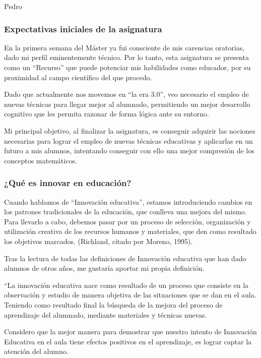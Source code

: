 \begin{opin}{\pedrocolor}{Pedro}

\subsubsection{Expectativas iniciales de la asignatura}

En la primera semana del Máster ya fui consciente de mis carencias oratorias, dado mi perfil eminentemente técnico. Por lo tanto, esta asignatura se presenta como un “Recurso” que puede potenciar mis habilidades como educador, por su proximidad al campo científico del que procedo.

Dado que actualmente nos movemos en “la era 3.0”, veo necesario el empleo de nuevas técnicas para llegar mejor al alumnado, permitiendo un mejor desarrollo cognitivo que les permita razonar de forma lógica ante su entorno. 

Mi principal objetivo, al finalizar la asignatura, es conseguir adquirir las nociones necesarias para lograr el empleo de nuevas técnicas educativas y aplicarlas en un futuro a mis alumnos, intentando conseguir con ello una mejor compresión de los conceptos matemáticos.

\subsubsection{¿Qué es innovar en educación?}

Cuando hablamos de “Innovación educativa”, estamos introduciendo cambios en los patrones tradicionales de la educación, que conlleva una mejora del mismo. Para llevarlo a cabo, debemos pasar por un proceso de selección, organización y utilización creativa de los recursos humanos y materiales, que den como resultado los objetivos marcados. (Richland, citado por Moreno, 1995).

Tras la lectura de todas las definiciones de Innovación educativa que han dado alumnos de otros años, me gustaría aportar mi propia definición.

“La innovación educativa nace como resultado de un proceso que consiste en la observación y estudio de manera objetiva de las situaciones que se dan en el aula. Teniendo como resultado final la búsqueda de la mejora del proceso de aprendizaje del alumnado, mediante materiales y técnicas nuevas.

Considero que la mejor manera para demostrar que nuestro intento de Innovación Educativa en el aula tiene efectos positivos en el aprendizaje, es lograr captar la atención del alumno.


\end{opin}
